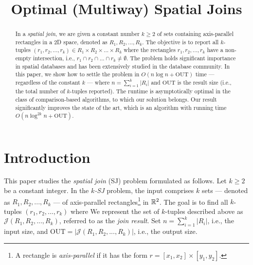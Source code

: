 \documentclass[sigconf]{acmart}
\def\J{\mathcal{J}}
\def\out{\mathrm{OUT}}
\begin{document}
    
\title{Optimal (Multiway) Spatial Joins}


\author{}


\begin{abstract}
    In a {\em spatial join}, we are given a constant number $k \geq 2$ of sets containing axis-parallel rectangles in a 2D space, denoted as $R_1, R_2, ..., R_k$. The objective is to report all $k$-tuples $(r_1, r_2, ..., r_k) \in R_1 \times R_2 \times ... \times R_k$ where the rectangles $r_1, r_2, ..., r_k$ have a non-empty intersection, i.e., $r_1 \cap r_2 \cap ... \cap r_k \neq \emptyset$. The problem holds significant importance in spatial databases and has been extensively studied in the database community. In this paper, we show how to settle the problem in $O(n \log n + \out)$ time --- regardless of the constant $k$ --- where $n = \sum_{i=1}^k |R_i|$ and $\out$ is the result size (i.e., the total number of $k$-tuples reported). The runtime  is asymptotically optimal in the class of comparison-based algorithms, to which our solution belongs. Our result significantly improves the state of the art, which is an algorithm with running time $O(n \log^{2k} n + \out)$.
\end{abstract}

\maketitle 

\section{Introduction} \label{sec:intro}

This paper studies the {\em spatial join} (SJ) problem formulated as follows. Let $k \ge 2$ be a constant integer. In the {\em $k$-SJ} problem, the input comprises $k$ sets --- denoted as $R_1, R_2, ..., R_k$ --- of axis-parallel rectangles\footnote{A rectangle is {\em axis-parallel} if it has the form $r = [x_1, x_2] \times [y_1, y_2]$.} in $\mathbb{R}^2$. The goal is to find all $k$-tuples $(r_1, r_2, ..., r_k)$ where
We represent the set of $k$-tuples described above as $\J(R_1, R_2, ..., R_k)$, referred to as the {\em join result}. Set $n = \sum_{i=1}^k |R_i|$, i.e., the input size, and $\out = |\J(R_1, R_2, ..., R_k)|$, i.e., the output size.
\end{document}
